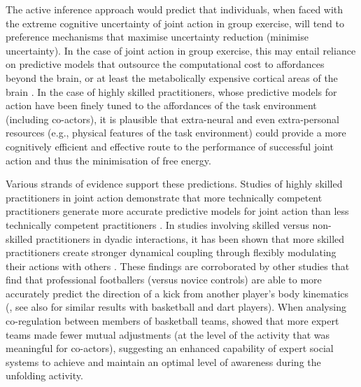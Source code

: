 \begin{CJK}{UTF8}{gbsn}
    The active inference approach would predict that individuals, when faced with the extreme cognitive uncertainty of joint action in group exercise, will tend to preference mechanisms that maximise uncertainty reduction (minimise uncertainty).  In the case of joint action in group exercise, this may entail reliance on predictive models that outsource the computational cost to affordances beyond the brain, or at least the metabolically expensive cortical areas of the brain \citep{Dietrich2004,Clark2015}.  In the case of highly skilled practitioners, whose predictive models for action have been finely tuned to the affordances of the task environment (including co-actors), it is plausible that extra-neural and even extra-personal resources (e.g., physical features of the task environment) could provide a more cognitively efficient and effective route to the performance of successful joint action and thus the minimisation of free energy.

    Various strands of evidence support these predictions.  Studies of highly skilled practitioners in joint action demonstrate that more technically competent practitioners generate more accurate predictive models for joint action than less technically competent practitioners \citep{Tomeo2012,Aglioti2008,Mulligan2016}.   In studies involving skilled versus non-skilled practitioners in dyadic interactions, it has been shown that more skilled practitioners create stronger dynamical coupling through flexibly modulating their actions with others \citep{Schmidt2011,Caron2017}. These findings are corroborated by other studies that find that professional footballers (versus novice controls) are able to more accurately predict the direction of a kick from another player's body kinematics (\cite{Tomeo2012}, see also \cite{Aglioti2008,Mulligan2016} for similar results with basketball and dart players).  When analysing co-regulation between members of basketball teams, \textcite{Bourbousson2015} showed that more expert teams made fewer mutual adjustments (at the level of the activity that was meaningful for co-actors), suggesting an enhanced capability of expert social systems to achieve and maintain an optimal level of awareness during the unfolding activity.


\end{CJK}
